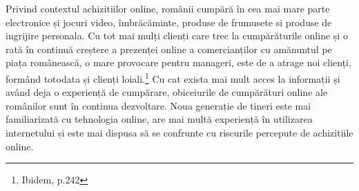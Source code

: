 \documentclass[a4paper, 12pt]{article}
\begin{document}
	\quad Privind contextul achizitiilor online, românii cumpără în cea mai mare parte electronice și jocuri video, îmbrăcăminte, produse de frumusete si produse de ingrijire personala. Cu tot mai mulți clienți care trec la cumpărăturile online și o rată în continuă creștere a prezenței online a comercianților cu amănuntul pe piața românească, o mare provocare pentru manageri, este de a atrage noi clienți, formând  totodata și clienți loiali.\footnote{Ibidem, p.242} Cu cat exista mai mult acces la informații și având deja o experiență de cumpărare, obiceiurile de cumpărături online ale românilor sunt în continua dezvoltare. Noua generație de tineri este mai familiarizată cu tehnologia online, are mai multă experiență în utilizarea internetului și este mai dispusa să se confrunte cu riscurile percepute de achizitiile online.
	
\end{document}

